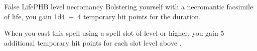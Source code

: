 \begin{spell}{False Life}{PHB}{ level necromancy}
{
}
Bolstering yourself with a necromantic facsimile of life,
you gain 1d4~+~4 temporary hit points for the duration.

 When you cast this spell using a
spell slot of  level or higher, you gain 5 additional
temporary hit points for each slot level above .
\end{spell}